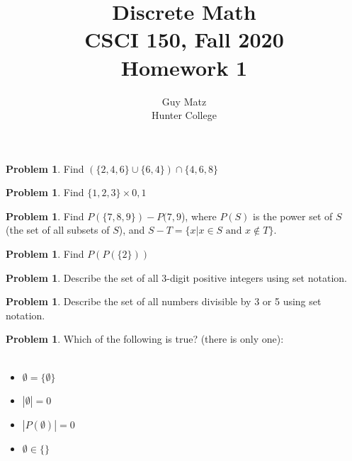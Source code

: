 \documentclass[10pt,leqno ]{article}
\title{Discrete Math\\
CSCI 150, Fall 2020\\
Homework 1}
\author{Guy Matz \\
Hunter College}
\theoremstyle{definition}
\newtheorem{problem}[theorem]{Problem}
\begin{document}
\begin{problem} Find $(\{2,4,6\} \cup  \{6,4\}) \cap \{4,6,8\}$
\\
\Large

\end{problem}
\newpage

\begin{problem} Find $\{1,2,3\} \times {0,1}$
\\
\Large

\end{problem}
\newpage
\begin{problem} Find $P(\{7,8,9\})-P({7,9}$), where $P(S)$ is the power set of $S$ (the set of all subsets of $S$), and $S-T = \{x|x \in S \text{ and } x \notin T\}$.
\\
\Large

\end{problem}
\newpage
\begin{problem} Find $P(P(\{2\}))$
\\
\Large

\end{problem}
\newpage
\begin{problem} Describe the set of all 3-digit positive integers using set notation.
\\
\Large

\end{problem}
\newpage
\begin{problem} Describe the set of all numbers divisible by 3 or 5 using set notation.
\\
\Large

\end{problem}
\newpage

\begin{problem} Which  of  the  following  is  true?   (there  is  only  one):
\\\\
\begin{itemize}
\item $\emptyset=\{\emptyset\}$
\item $|\emptyset|=  0$
\item $|P(\emptyset)|= 0$
\item $\emptyset \in \{ \}$
\end{itemize}
\Large

\end{problem}
\newpage
\end{document}

